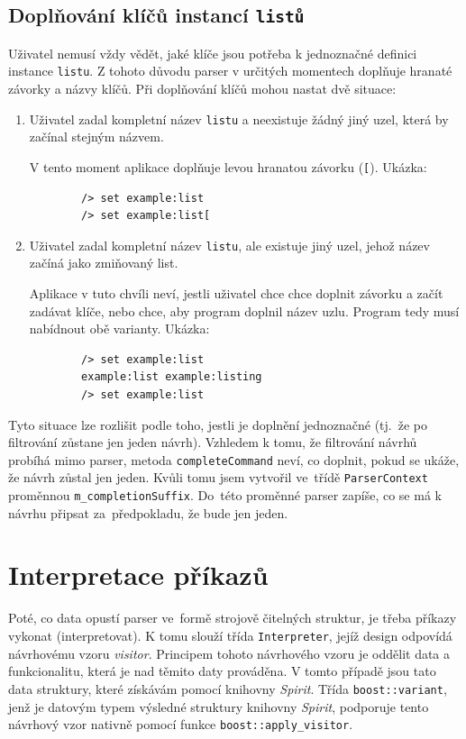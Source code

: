 \documentclass[thesis=B,czech,hidelinks]{FITthesis}[2019/03/06]
\begin{document}
\subsection{Doplňování klíčů instancí \texttt{listů}}
Uživatel nemusí vždy vědět, jaké klíče jsou potřeba k jednoznačné definici instance \texttt{listu}. Z tohoto důvodu parser v určitých momentech doplňuje hranaté závorky a názvy klíčů. Při doplňování klíčů mohou nastat dvě situace:

\begin{enumerate}
    \item Uživatel zadal kompletní název \texttt{listu} a neexistuje žádný jiný uzel, která by začínal stejným názvem.

        V tento moment aplikace doplňuje levou hranatou závorku (\verb¨[¨). Ukázka:
        \begin{verbatim}
        /> set example:list
        /> set example:list[
        \end{verbatim}

    \item Uživatel zadal kompletní název \texttt{listu}, ale existuje jiný uzel, jehož název začíná jako zmiňovaný list.

        Aplikace v tuto chvíli neví, jestli uživatel chce chce doplnit závorku a začít zadávat klíče, nebo chce, aby program doplnil název uzlu. Program tedy musí nabídnout obě varianty. Ukázka:
        \begin{verbatim}
        /> set example:list
        example:list example:listing
        /> set example:list
        \end{verbatim}

\end{enumerate}
Tyto situace lze rozlišit podle toho, jestli je doplnění jednoznačné (tj.\ že po filtrování zůstane jen jeden návrh). Vzhledem k tomu, že filtrování návrhů probíhá mimo parser, metoda \texttt{completeCommand} neví, co doplnit, pokud se ukáže, že návrh zůstal jen jeden. Kvůli tomu jsem vytvořil ve~třídě \texttt{ParserContext} proměnnou \texttt{m\_completionSuffix}. Do~této proměnné parser zapíše, co se má k návrhu připsat za~předpokladu, že bude jen jeden.


\section{Interpretace příkazů}\label{interpreter}
Poté, co data opustí parser ve~formě strojově čitelných struktur, je třeba příkazy vykonat (interpretovat). K tomu slouží třída \texttt{Interpreter}, jejíž design odpovídá návrhovému vzoru \textit{visitor}. Principem tohoto návrhového vzoru je oddělit data a funkcionalitu, která je nad těmito daty prováděna. V tomto případě jsou tato data struktury, které získávám pomocí knihovny \textit{Spirit}. Třída \texttt{boost::variant}, jenž je datovým typem výsledné struktury knihovny \textit{Spirit}, podporuje tento návrhový vzor nativně pomocí funkce \texttt{boost::apply\_visitor}.
\end{document}
